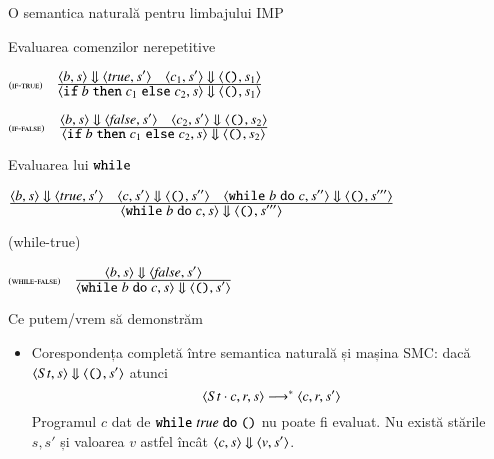 \documentclass[xcolor=pdftex,romanian,colorlinks]{beamer}
\begin{document}
\begin{section}{O semantica naturală pentru limbajului IMP}
\begin{frame}{Evaluarea comenzilor nerepetitive}
\begin{itemize}
\vitem[]
$\reg[if-true]{\S{\c{\Sif b \Sthen c_1 \Selse c_2,s}}{\c{\Sskip,s_1}}}{\S{\c{b,s}}{\c{\Strue, s'}}\si \S{\c{c_1,s'}}{\c{\Sskip, s_1}}}{}$

\vitem[]
$\reg[if-false]{\S{\c{\Sif b \Sthen c_1 \Selse c_2,s}}{\c{\Sskip,s_2}}}{\S{\c{b,s}}{\c{\Sfalse, s'}}\si \S{\c{c_2,s'}}{\c{\Sskip, s_2}}}{}$


\end{itemize}
\end{frame}

\begin{frame}{Evaluarea lui $\mathrel{\text{\ttfamily while}}$}
\ 

\medskip\vfill
$\reg{\S{\c{\Swhile b \Sdo c,s}}{\c{\Sskip,s'''}}}{\S{\c{b,s}}{\c{\Strue, s'}}\si \S{\c{c,s'}}{\c{\Sskip, s''}}\si \S{\c{\Swhile b \Sdo c,s''}}{\c{\Sskip,s'''}}}{}$

\hfill ({\sc while-true})

\vfill
$\reg[while-false]{\S{\c{\Swhile b \Sdo c,s}}{\c{\Sskip,s'}}}{\S{\c{b,s}}{\c{\Sfalse, s'}}}{}$

\vfill
\end{frame}

\begin{frame}{Ce putem/vrem să demonstrăm}
\begin{itemize}
\item Corespondența completă între semantica naturală și mașina SMC: dacă $\displaystyle{\ensuremath {{\langle{St, s}\rangle}} \Downarrow {{\ensuremath \langle{\ensuremath\mathrel{\text{\ttfamily ()}}, s'}\rangle}}}$ atunci \[{\langle{St\cdot c, r, s}\rangle} \longrightarrow^\ast {\ensuremath \langle{c, r, s'}\rangle}\]
\vitem Programul $c$ dat de $\mathrel{\text{\ttfamily while}} {{\it true}} \mathrel{\text{\ttfamily do}} {\mathrel{\text{\ttfamily ()}}}$ nu poate fi evaluat.  Nu există stările $s, s'$ și valoarea $v$ astfel încât $\displaystyle{\ensuremath {{\langle{c,s}\rangle}} \Downarrow {{\ensuremath \langle{v,s'}\rangle}}}$. 
\end{itemize}
\end{frame}


\end{section}
\end{document}
